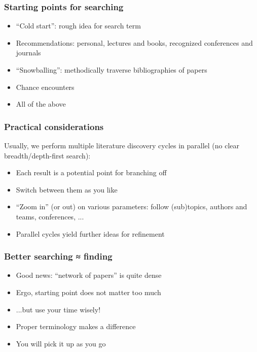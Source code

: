 \documentclass[]{beamer} %
\begin{document}
\begin{frame}
\frametitle{Starting points for searching}
\begin{itemize}
	\item ``Cold start'': rough idea for search term
	\item Recommendations: personal, lectures and books, recognized conferences and journals
	\item ``Snowballing'': methodically traverse bibliographies of papers \cite{snowballing}
	\item Chance encounters
	\item \alert{All of the above}
\end{itemize}
\end{frame}


\begin{frame}
\frametitle{Practical considerations}
Usually, we perform multiple literature discovery cycles in parallel (no clear breadth/depth-first search):
\begin{itemize}
	\item Each result is a potential point for branching off
	\item Switch between them as you like
	\item ``Zoom in'' (or out) on various parameters: follow (sub)topics, authors and teams, conferences, ...
	\item Parallel cycles yield further ideas for refinement
\end{itemize}
\end{frame}


\begin{frame}
\frametitle{Better searching ≈ finding}
\begin{itemize}
	\item Good news: ``network of papers'' is quite dense
	\item Ergo, starting point does not matter too much
	\item ...but use your time wisely!
	\item Proper terminology makes a difference
	\item You will pick it up as you go
\end{itemize}
\end{frame}
\end{document}
